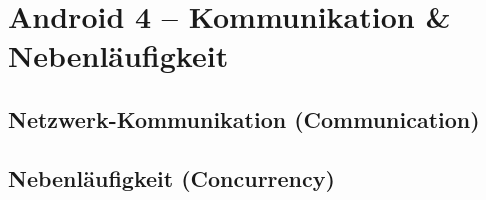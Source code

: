 \chapter{Android 4 – Kommunikation \& Nebenläufigkeit}

\section{Netzwerk-Kommunikation (Communication)}

\section{Nebenläufigkeit (Concurrency)}